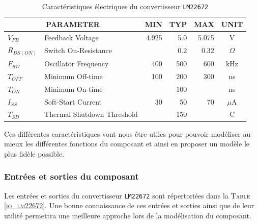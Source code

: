 			\begin{table}[h]
				\begin{center}
					\begin{tabular}{|l l | r r r | c|}
					\hline
					\multicolumn{2}{|c|}{\textbf{PARAMETER}}	& \textbf{MIN}	& \textbf{TYP}	
																& \textbf{MAX}	& \textbf{UNIT}\\
					\hline
					$V_{FB}$		&	Feedback Voltage		& 4.925	&	5.0	& 5.075	&	V			\\
					\hline
					$R_{DS(ON)}$ 	& 	Switch On-Resistance 	&		&	0.2	&  0.32	&	$\Omega$	\\
					\hline
					$F_{SW}$		&	Oscillator Frequency	&	400	&	500	&	600	&	kHz			\\
					\hline
					$T_{OFF}$		&	Minimum Off-time		&	100	&	200	&	300	&	ns			\\
					\hline
					$T_{ON}$		&	Minimum On-time			&		&	100	&		&	ns			\\
					\hline
					$I_{SS}$		& 	Soft-Start Current		&	30	&	50	&	70	&	$\mu$A		\\
					\hline
					$T_{SD}$		& 	Thermal Shutdown Threshold	&	&	150	&		&	\degre C	\\
					\hline
				\end{tabular}				
				\end{center}	
				\caption{Caractéristiques électriques du convertisseur \texttt{LM22672} \cite{LM22672}}
				\label{carac_elec_lm22672}
			\end{table}
			
			Ces différentes caractéristiques vont nous être utiles pour pouvoir 
			modéliser au mieux les différentes fonctions du composant et ainsi
			en proposer un modèle le plus fidèle possible.
		 
			\subsubsection{Entrées et sorties du composant}
			
			Les entrées et sorties du convertisseur \texttt{LM22672} sont répertoriées dans la
			\textsc{Table \ref{io_lm22672}}. 
			Une bonne connaissance de ces entrées et sorties ainsi que de leur 
			utilité permettra une meilleure approche lors de la modélisation 
			du composant.
			
